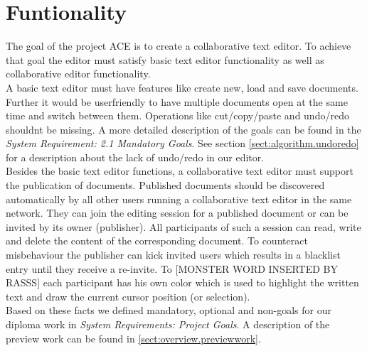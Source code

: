 \chapter{Funtionality}
\label{chapter:functionality}

The goal of the project ACE is to create a collaborative text editor. To achieve that goal the editor must satisfy basic text editor functionality as well as collaborative editor functionality.\\

A basic text editor must have features like create new, load and save documents. Further it would be userfriendly to have multiple documents open at the same time and switch between them. Operations like cut/copy/paste and undo/redo shouldnt be missing. A more detailed description of the goals can be found in the \textit{System Requirement: 2.1 Mandatory Goals}. See section \ref{sect:algorithm.undoredo} for a description about the lack of undo/redo in our editor.\\

Besides the basic text editor functions, a collaborative text editor must support the publication of documents. Published documents should be discovered automatically by all other users running a collaborative text editor in the same network. They can join the editing session for a published document or can be invited by its owner (publisher). All participants of such a session can read, write and delete the content of the corresponding document. To counteract misbehaviour the publisher can kick invited users which results in a blacklist entry until they receive a re-invite. To [MONSTER WORD INSERTED BY RASSS] each participant has his own color which is used to highlight the written text and draw the current cursor position (or selection).\\

Based on these facts we defined mandatory, optional and non-goals for our diploma work in \textit{System Requirements: Project Goals}. A description of the preview work can be found in \ref{sect:overview.previewwork}.
